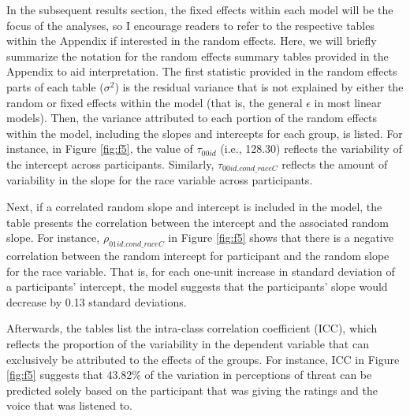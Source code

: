 \documentclass[
  english,
  man, noextraspace,floatsintext]{apa6}
\begin{document}
In the subsequent results section, the fixed effects within each model will be the focus of the analyses, so I encourage readers to refer to the respective tables within the Appendix if interested in the random effects. Here, we will briefly summarize the notation for the random effects summary tables provided in the Appendix to aid interpretation. The first statistic provided in the random effects parts of each table (\(\sigma^2\)) is the residual variance that is not explained by either the random or fixed effects within the model (that is, the general \(\epsilon\) in most linear models). Then, the variance attributed to each portion of the random effects within the model, including the slopes and intercepts for each group, is listed. For instance, in Figure \ref{fig:f5}, the value of \(\tau_{00 id}\) (i.e., 128.30) reflects the variability of the intercept across participants. Similarly, \(\tau_{00 id.cond\_raceC}\) reflects the amount of variability in the slope for the race variable across participants.

Next, if a correlated random slope and intercept is included in the model, the table presents the correlation between the intercept and the associated random slope. For instance, \(\rho_{01 id.cond\_raceC}\) in Figure \ref{fig:f5} shows that there is a negative correlation between the random intercept for participant and the random slope for the race variable. That is, for each one-unit increase in standard deviation of a participants' intercept, the model suggests that the participants' slope would decrease by 0.13 standard deviations.

Afterwards, the tables list the intra-class correlation coefficient (ICC), which reflects the proportion of the variability in the dependent variable that can exclusively be attributed to the effects of the groups. For instance, ICC in Figure \ref{fig:f5} suggests that 43.82\% of the variation in perceptions of threat can be predicted solely based on the participant that was giving the ratings and the voice that was listened to.
\end{document}
